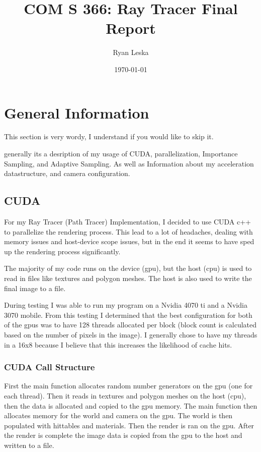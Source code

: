 \documentclass{article}
\title{COM S 366: Ray Tracer Final Report}
\author{Ryan Leska}
\date{\today}
\begin{document}
\maketitle

\tableofcontents
\twocolumn





\section{General Information}

    This section is very wordy, I understand if you would like to skip it. \par
    generally its a desription of my usage of CUDA, parallelization, Importance Sampling, and Adaptive Sampling. As well as Information about my acceleration datastructure, and camera configuration. \par

    \subsection{CUDA}
    For my Ray Tracer (Path Tracer) Implementation, I decided to use CUDA c++ to parallelize the rendering process. This lead to a lot of headaches, dealing with memory issues and host-device scope issues, but in the end it seems to have sped up the rendering process significantly. \par

    The majority of my code runs on the device (gpu), but the host (cpu) is used to read in files like  textures and polygon meshes. The host is also used to write the final image to a file. \par  

    During testing I was able to run my program on a Nvidia 4070 ti and a Nvidia 3070 mobile. From this testing I determined that the best configuration for both of the gpus was to have 128 threads allocated per block (block count is calculated based on the number of pixels in the image). I generally chose to have my threads in a 16x8 because I believe that this increases the likelihood of cache hits. \par

        \subsubsection{CUDA Call Structure}
        First the main function allocates random number generators on the gpu (one for each thread). Then it reads in textures and polygon meshes on the host (cpu), then the data is allocated and copied to the gpu memory. The main function then allocates memory for the world and camera on the gpu. The world is then populated with hittables and materials. Then the render is ran on the gpu. After the render is complete the image data is copied from the gpu to the host and written to a file. \par
\end{document}
